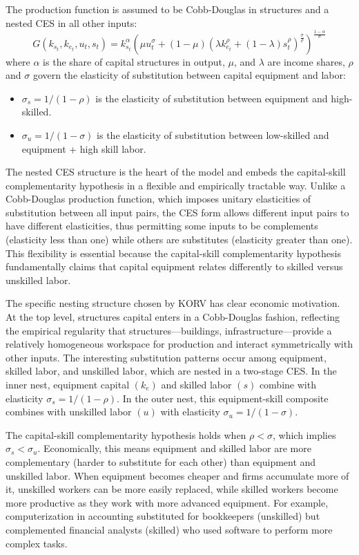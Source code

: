 \documentclass[12pt]{article}
\begin{document}
The production function is assumed to be Cobb-Douglas in structures and a nested CES in all other inputs:
\begin{equation}\label{eq:production_fun}
 G(k_{s_t}, k_{e_t}, u_t, s_t) = k_{s_t}^\alpha\left( \mu u_t^\sigma + (1-\mu)\left(\lambda k_{e_t}^\rho + (1-\lambda)s_t^\rho\right)^\frac{\sigma}{\rho}\right)^\frac{1-\alpha}{\sigma}
\end{equation}
where $\alpha$ is the share of capital structures in output, $\mu$, and $\lambda$ are income shares, $\rho$ and $\sigma$ govern the elasticity of substitution between capital equipment and labor:
\begin{itemize}
 \item $\sigma_s = 1/(1-\rho)$ is the elasticity of substitution between equipment and high-skilled.
 \item $\sigma_u = 1/(1-\sigma)$ is the elasticity of substitution between low-skilled and equipment + high skill labor.
\end{itemize}

The nested CES structure is the heart of the model and embeds the capital-skill complementarity hypothesis in a flexible and empirically tractable way. Unlike a Cobb-Douglas production function, which imposes unitary elasticities of substitution between all input pairs, the CES form allows different input pairs to have different elasticities, thus permitting some inputs to be complements (elasticity less than one) while others are substitutes (elasticity greater than one). This flexibility is essential because the capital-skill complementarity hypothesis fundamentally claims that capital equipment relates differently to skilled versus unskilled labor.

The specific nesting structure chosen by KORV has clear economic motivation. At the top level, structures capital enters in a Cobb-Douglas fashion, reflecting the empirical regularity that structures---buildings, infrastructure---provide a relatively homogeneous workspace for production and interact symmetrically with other inputs. The interesting substitution patterns occur among equipment, skilled labor, and unskilled labor, which are nested in a two-stage CES. In the inner nest, equipment capital $(k_e)$ and skilled labor $(s)$ combine with elasticity $\sigma_s = 1/(1-\rho)$. In the outer nest, this equipment-skill composite combines with unskilled labor $(u)$ with elasticity $\sigma_u = 1/(1-\sigma)$.

The capital-skill complementarity hypothesis holds when $\rho < \sigma$, which implies $\sigma_s < \sigma_u$. Economically, this means equipment and skilled labor are more complementary (harder to substitute for each other) than equipment and unskilled labor. When equipment becomes cheaper and firms accumulate more of it, unskilled workers can be more easily replaced, while skilled workers become more productive as they work with more advanced equipment. For example, computerization in accounting substituted for bookkeepers (unskilled) but complemented financial analysts (skilled) who used software to perform more complex tasks.
\end{document}
